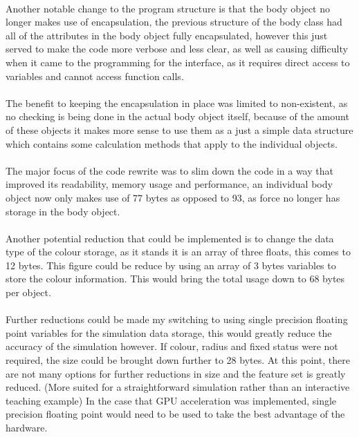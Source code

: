 \paragraph{}
Another notable change to the program structure is that the body object no longer makes use of encapsulation, the previous structure of the body class had all of the attributes in the body object fully encapsulated, however this just served to make the code more verbose and less clear, as well as causing difficulty when it came to the programming for the interface, as it requires direct access to variables and cannot access function calls.

\paragraph{}
The benefit to keeping the encapsulation in place was limited to non-existent, as no checking is being done in the actual body object itself, because of the amount of these objects it makes more sense to use them as a just a simple data structure which contains some calculation methods that apply to the individual objects.

\paragraph{}
The major focus of the code rewrite was to slim down the code in a way that improved its readability, memory usage and performance, an individual body object now only makes use of 77 bytes as opposed to 93, as force no longer has storage in the body object.

\paragraph{}
Another potential reduction that could be implemented is to change the data type of the colour storage, as it stands it is an array of three floats, this comes to 12 bytes. This figure could be reduce by using an array of 3 bytes variables to store the colour information. This would bring the total usage down to 68 bytes per object.

\paragraph{}
Further reductions could be made my switching to using single precision floating point variables for the simulation data storage, this would greatly reduce the accuracy of the simulation however. If colour, radius and fixed status were not required, the size could be brought down further to 28 bytes. At this point, there are not many options for further reductions in size and the feature set is greatly reduced. (More suited for a straightforward simulation rather than an interactive teaching example) In the case that GPU acceleration was implemented, single precision floating point would need to be used to take the best advantage of the hardware.

